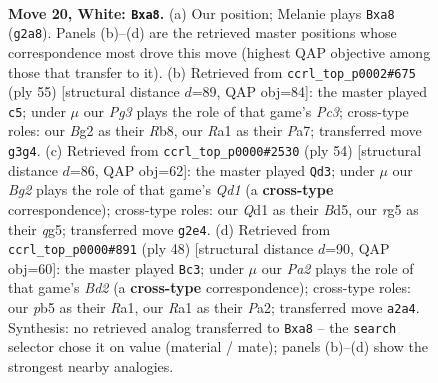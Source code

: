 \documentclass[11pt]{article}
\begin{document}
\clearpage

\begin{figure}[p]\centering
\begin{subfigure}{0.46\textwidth}\centering
\resizebox{\linewidth}{!}{%
\newchessgame
\chessboard[
  setfen={rnb1k3/8/5q2/ppb2pr1/8/6P1/PP2PPB1/R2QNRK1 w q - 0 20},
  showmover=false,
  pgfstyle=straightmove, color=movearrow, markmove={g2-a8}
]}
\caption{}
\end{subfigure}\hfill
\begin{subfigure}{0.46\textwidth}\centering
\resizebox{\linewidth}{!}{%
\newchessgame
\chessboard[
  setfen={1r3r1k/pb4qp/1pp5/7Q/4B1P1/8/PP5P/3RR1K1 b - - 7 28},
  showmover=false,
  pgfstyle=straightmove, color=movearrow, markmove={c6-c5}
]}
\caption{}
\end{subfigure}
\\[4pt]
\begin{subfigure}{0.46\textwidth}\centering
\resizebox{\linewidth}{!}{%
\newchessgame
\chessboard[
  setfen={1r5k/3b2pp/3p1r2/R2Bp1q1/8/1PP3P1/5P2/3Q1RK1 w - - 1 28},
  showmover=false,
  pgfstyle=straightmove, color=movearrow, markmove={d1-d3}
]}
\caption{}
\end{subfigure}\hfill
\begin{subfigure}{0.46\textwidth}\centering
\resizebox{\linewidth}{!}{%
\newchessgame
\chessboard[
  setfen={r2q3k/pp4pp/2bp1r2/8/5P2/8/PP1B1QPP/R2R3K w - - 4 25},
  showmover=false,
  pgfstyle=straightmove, color=movearrow, markmove={d2-c3}
]}
\caption{}
\end{subfigure}
\caption{\textbf{Move 20, White: \texttt{Bxa8}.} (a) Our position; Melanie plays \texttt{Bxa8} (\texttt{g2a8}). Panels (b)--(d) are the retrieved master positions whose correspondence most drove this move (highest QAP objective among those that transfer to it). (b) Retrieved from \texttt{ccrl\_top\_p0002\#675} (ply 55) [structural distance $d$=89, QAP obj=84]: the master played \texttt{c5}; under $\mu$ our \emph{Pg3} plays the role of that game's \emph{Pc3}; cross-type roles: our \emph{B}g2 as their \emph{R}b8, our \emph{R}a1 as their \emph{P}a7; transferred move \texttt{g3g4}. (c) Retrieved from \texttt{ccrl\_top\_p0000\#2530} (ply 54) [structural distance $d$=86, QAP obj=62]: the master played \texttt{Qd3}; under $\mu$ our \emph{Bg2} plays the role of that game's \emph{Qd1} (a \textbf{cross-type} correspondence); cross-type roles: our \emph{Q}d1 as their \emph{B}d5, our \emph{r}g5 as their \emph{q}g5; transferred move \texttt{g2e4}. (d) Retrieved from \texttt{ccrl\_top\_p0000\#891} (ply 48) [structural distance $d$=90, QAP obj=60]: the master played \texttt{Bc3}; under $\mu$ our \emph{Pa2} plays the role of that game's \emph{Bd2} (a \textbf{cross-type} correspondence); cross-type roles: our \emph{p}b5 as their \emph{R}a1, our \emph{R}a1 as their \emph{P}a2; transferred move \texttt{a2a4}. Synthesis: no retrieved analog transferred to \texttt{Bxa8} -- the \texttt{search} selector chose it on value (material / mate); panels (b)--(d) show the strongest nearby analogies.}
\label{fig:thought-m38}
\end{figure}
\end{document}

